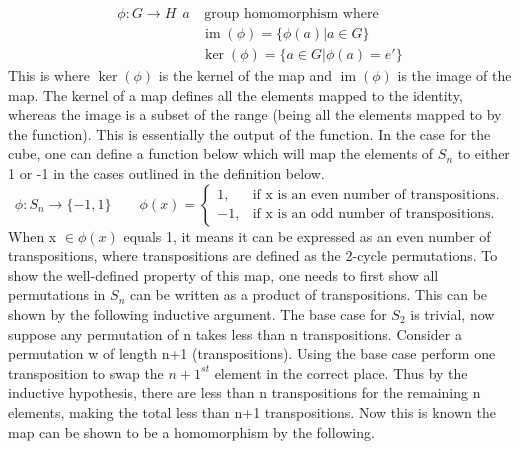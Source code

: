 \documentclass{article}
\newcounter{prop}[section]\setcounter{prop}{0}
\newcounter{lem}[section]\setcounter{lem}{0}
\DeclareMathOperator{\imF}{im}
\DeclareMathOperator{\kerF}{ker}
\begin{document}
\begin{align*}
\phi : G\rightarrow H\ \ a&\ \text{group homomorphism where}\\
&\imF(\phi) = \{\phi(a) | a \in G\}\\
&\kerF(\phi)= \{a\in G |\phi(a) = e'\}
\end{align*}
This is where $\kerF(\phi)$ is the kernel of the map and $\imF(\phi)$ is the image of the map. The kernel of a map defines all the elements mapped to the identity, whereas the image is a subset of the range (being all the elements mapped to by the function). This is essentially the output of the function.
In the case for the cube, one can define a function below which will map the elements of $S_{n}$ to either 1 or -1 in the cases outlined in the definition below.
\begin{equation}
\phi : S_{n} \rightarrow \{-1,1\} \qquad
  \phi(x)=\begin{cases}
    1, & \text{if x is an even number of transpositions}.\\
    -1, & \text{if x is an odd number of transpositions}.
  \end{cases}
\end{equation}
When x $\in \phi(x)$ equals 1, it means it can be expressed as an even number of transpositions, where transpositions are defined as the 2-cycle permutations. To show the well-defined property of this map, one needs to first show all permutations in $S_{n}$ can be written as a product of transpositions.%
 This can be shown by the following inductive argument. The base case for $S_{2}$ is trivial, now suppose any permutation of n takes less than n transpositions. Consider a permutation w of length n+1 (transpositions). Using the base case  perform one transposition to swap the $n+1^{st}$ element in the correct place. Thus by the inductive hypothesis, there are less than n transpositions for the remaining n elements, making the total less than n+1 transpositions. 
Now this is known the map can be shown to be a homomorphism by the following.
\end{document}
